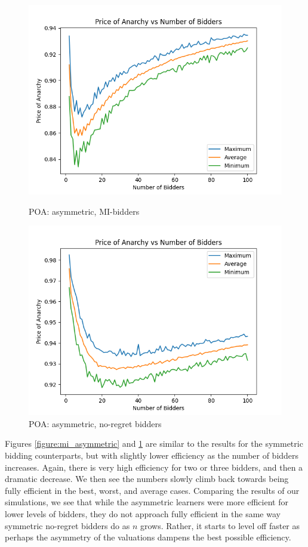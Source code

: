 \documentclass[12pt,twoside]{reedthesis}
\begin{document}
\begin{figure}
	\centering
	\begin{minipage}{0.49\textwidth}
		\centering
		\includegraphics[scale=0.5]{Figures/zi_asymmetric}
		\caption{POA: asymmetric, MI-bidders}
		\label{figure:mi_asymmetric}
	\end{minipage}
	\begin{minipage}{0.49\textwidth}
		\centering
		\includegraphics[scale=0.5]{Figures/asymmetric}
		\caption{POA: asymmetric, no-regret bidders}
		\label{figure:asymmetric}
	\end{minipage}
\end{figure}

Figures \ref{figure:mi_asymmetric} and \ref{figure:asymmetric} are similar to the results for the symmetric bidding counterparts, but with slightly lower efficiency as the number of bidders increases. Again, there is very high efficiency for two or three bidders, and then a dramatic decrease. We then see the numbers slowly climb back towards being fully efficient in the best, worst, and average cases. Comparing the results of our simulations, we see that while the asymmetric learners were more efficient for lower levels of bidders, they do not approach fully efficient in the same way symmetric no-regret bidders do as $n$ grows. Rather, it starts to level off faster as perhaps the asymmetry of the valuations dampens the best possible efficiency. 
\end{document}
